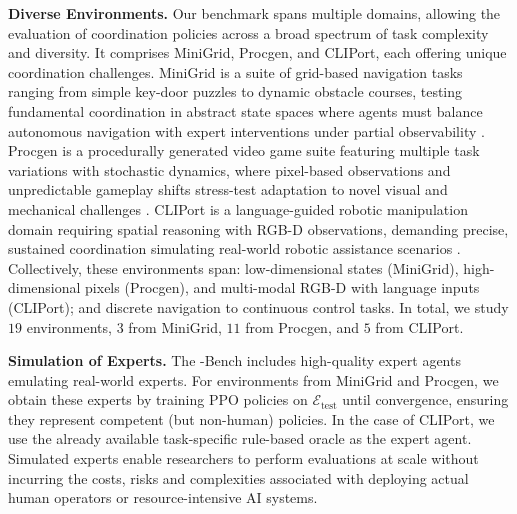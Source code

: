 
\textbf{Diverse Environments.}  
Our benchmark spans multiple domains, allowing the evaluation of coordination policies across a broad spectrum of task complexity and diversity. 
It comprises MiniGrid, Procgen, and CLIPort, each offering unique coordination challenges. MiniGrid is a suite of grid-based navigation tasks ranging from simple key-door puzzles to dynamic obstacle courses, testing fundamental coordination in abstract state spaces where agents must balance autonomous navigation with expert interventions under partial observability \citep{MinigridMiniworld23}. Procgen is a procedurally generated video game suite featuring multiple task variations with stochastic dynamics, where pixel-based observations and unpredictable gameplay shifts stress-test adaptation to novel visual and mechanical challenges \citep{pmlr-v119-cobbe20a}. CLIPort is a language-guided robotic manipulation domain requiring spatial reasoning with RGB-D observations, demanding precise, sustained coordination simulating real-world robotic assistance scenarios \citep{shridhar2021cliport}. Collectively, these environments span: low-dimensional states (MiniGrid), high-dimensional pixels (Procgen), and multi-modal RGB-D with language inputs (CLIPort); and discrete navigation to continuous control tasks. 
In total, we study $19$ environments, $3$ from MiniGrid, $11$ from Procgen, and $5$ from CLIPort.

\textbf{Simulation of Experts.}  
The \ourMethod-Bench includes high-quality expert agents emulating real-world experts. For environments from MiniGrid and Procgen, we obtain these experts by training PPO policies on $\mathcal{E}_{\text{test}}$ until convergence, ensuring they represent competent (but non-human) policies. 
In the case of CLIPort, we use the already available task-specific rule-based oracle as the expert agent. Simulated experts enable researchers to perform evaluations at scale without incurring the costs, risks and complexities associated with deploying actual human operators or resource-intensive AI systems.





